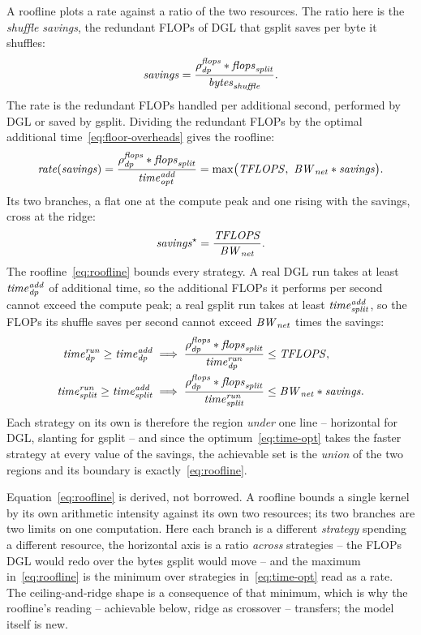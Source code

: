 A roofline plots a rate against a ratio of the two resources. The ratio here is the \emph{shuffle
savings}, the redundant FLOPs of DGL that gsplit saves per byte it shuffles:
\begin{equation}
  \mathit{savings} = \frac{\rho^{\mathit{flops}}_{\mathit{dp}}\ast \mathit{flops}_{\mathit{split}}}{\mathit{bytes}_{\mathit{shuffle}}} .
  \label{eq:savings}
\end{equation}
The rate is the redundant FLOPs handled per additional second, performed by DGL or saved by gsplit.
Dividing the redundant FLOPs by the optimal additional time~\eqref{eq:floor-overheads} gives the
roofline:
\begin{equation}
  \mathit{rate}(\mathit{savings}) = \frac{\rho^{\mathit{flops}}_{\mathit{dp}}\ast \mathit{flops}_{\mathit{split}}}{\mathit{time}^{\mathit{add}}_{\mathit{opt}}}
   = \max\!\big(\mathit{TFLOPS},\ \mathit{BW}_{\mathit{net}}\ast \mathit{savings}\big) .
  \label{eq:roofline}
\end{equation}
Its two branches, a flat one at the compute peak and one rising with the savings, cross at the
ridge:
\begin{equation}
  \mathit{savings}^\star = \frac{\mathit{TFLOPS}}{\mathit{BW}_{\mathit{net}}} .
  \label{eq:ridge}
\end{equation}
The roofline~\eqref{eq:roofline} bounds every strategy. A real DGL run takes at least $\mathit{time}^{\mathit{add}}_{\mathit{dp}}$
of additional time, so the additional FLOPs it performs per second cannot exceed the compute peak; a
real gsplit run takes at least $\mathit{time}^{\mathit{add}}_{\mathit{split}}$, so the FLOPs its shuffle saves per second cannot exceed
$\mathit{BW}_{\mathit{net}}$ times the savings:
\begin{equation}
\begin{aligned}
  \mathit{time}^{\mathit{run}}_{\mathit{dp}} \ge \mathit{time}^{\mathit{add}}_{\mathit{dp}}
  &\;\Longrightarrow\;
  \frac{\rho^{\mathit{flops}}_{\mathit{dp}}\ast \mathit{flops}_{\mathit{split}}}{\mathit{time}^{\mathit{run}}_{\mathit{dp}}} \le \mathit{TFLOPS},\\
  \mathit{time}^{\mathit{run}}_{\mathit{split}} \ge \mathit{time}^{\mathit{add}}_{\mathit{split}}
  &\;\Longrightarrow\;
  \frac{\rho^{\mathit{flops}}_{\mathit{dp}}\ast \mathit{flops}_{\mathit{split}}}{\mathit{time}^{\mathit{run}}_{\mathit{split}}} \le \mathit{BW}_{\mathit{net}}\ast \mathit{savings} .
\end{aligned}
  \label{eq:regions}
\end{equation}
Each strategy on its own is therefore the region \emph{under} one line -- horizontal for DGL,
slanting for gsplit -- and since the optimum~\eqref{eq:time-opt} takes the faster strategy at every
value of the savings, the achievable set is the \emph{union} of the two regions and its boundary is
exactly~\eqref{eq:roofline}.

Equation~\eqref{eq:roofline} is derived, not borrowed. A roofline bounds a single kernel by its own
arithmetic intensity against its own two resources; its two branches are two limits on one
computation. Here each branch is a different \emph{strategy} spending a different resource, the
horizontal axis is a ratio \emph{across} strategies -- the FLOPs DGL would redo over the bytes gsplit
would move -- and the maximum in~\eqref{eq:roofline} is the minimum over strategies
in~\eqref{eq:time-opt} read as a rate. The ceiling-and-ridge shape is a consequence of that minimum,
which is why the roofline's reading -- achievable below, ridge as crossover -- transfers; the model
itself is new.

